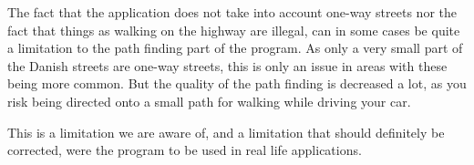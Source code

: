 The fact that the application does not take into account one-way streets nor the fact that things as walking on the highway are illegal, can in some cases be quite a limitation to the path finding part of the program. As only a very small part of the Danish streets are one-way streets, this is only an issue in areas with these being more common. But the quality of the path finding is decreased a lot, as you risk being directed onto a small path for walking while driving your car.

This is a limitation we are aware of, and a limitation that should definitely be corrected, were the program to be used in real life applications.
